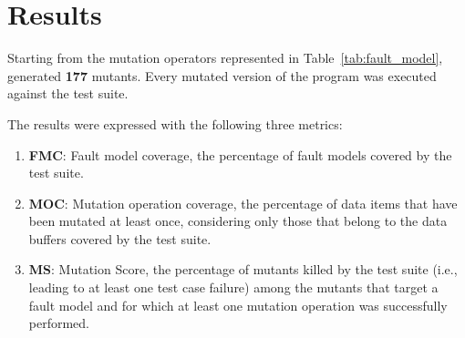 
\chapter{Results}


Starting from the mutation operators represented in Table~\ref{tab:fault_model}, \DAMA generated \textbf{177} mutants. Every mutated version of the program was executed against the \case test suite.

The results were expressed with the following three metrics:
\begin{enumerate}
\item \textbf{FMC}: Fault model coverage, the percentage of fault models covered by the test suite.
\item \textbf{MOC}: Mutation operation coverage, the percentage of data items that have been mutated at least once, considering only those that belong to the data buffers covered by the test suite.
\item \textbf{MS}: Mutation Score, the percentage of mutants killed by the test suite (i.e., leading to at least one test case failure) among the mutants that target a fault model and for which at least one mutation operation was successfully performed.
\end{enumerate}

